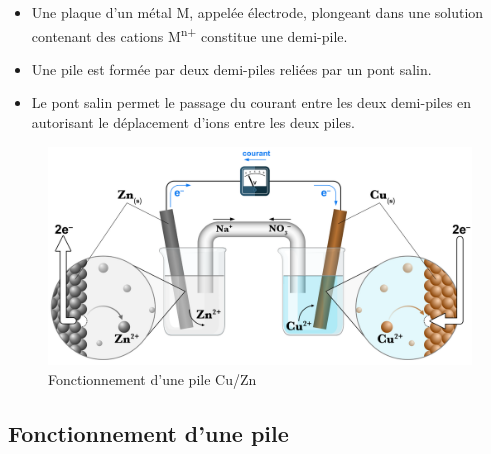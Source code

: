\documentclass[
  11pt,
  a4paper,
  openany]{book}
\providecommand{\tightlist}{%
  \setlength{\itemsep}{0pt}\setlength{\parskip}{0pt}}
\begin{document}
\begin{itemize}
\tightlist
\item
  Une plaque d'un métal M, appelée électrode, plongeant dans une solution contenant des cations M\textsuperscript{n+} constitue une demi-pile.
\item
  Une pile est formée par deux demi-piles reliées par un pont salin.
\item
  Le pont salin permet le passage du courant entre les deux demi-piles en autorisant le déplacement d'ions entre les deux piles.
\end{itemize}

\begin{figure}

{\centering \includegraphics[width=0.9\linewidth]{images/pile-electrique} 

}

\caption{Fonctionnement d’une pile Cu/Zn}\label{fig:pile-electrique}
\end{figure}
\clearpage

\hypertarget{fonctionnement-dune-pile}{%
\subsection{Fonctionnement d'une pile}\label{fonctionnement-dune-pile}}
\end{document}
